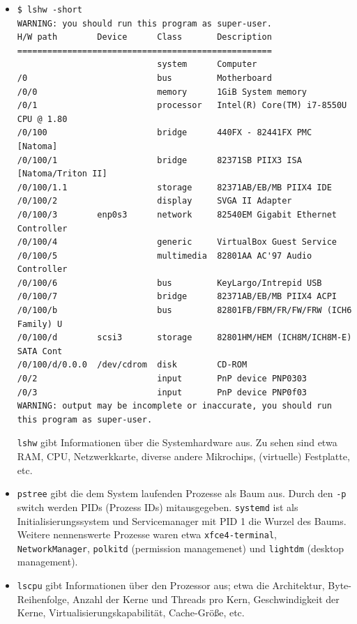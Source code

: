 \documentclass{article}
\begin{document}
\begin{itemize}
    \item \begin{lstlisting}[breaklines]
$ lshw -short
WARNING: you should run this program as super-user.
H/W path        Device      Class       Description
===================================================
                            system      Computer
/0                          bus         Motherboard
/0/0                        memory      1GiB System memory
/0/1                        processor   Intel(R) Core(TM) i7-8550U CPU @ 1.80
/0/100                      bridge      440FX - 82441FX PMC [Natoma]
/0/100/1                    bridge      82371SB PIIX3 ISA [Natoma/Triton II]
/0/100/1.1                  storage     82371AB/EB/MB PIIX4 IDE
/0/100/2                    display     SVGA II Adapter
/0/100/3        enp0s3      network     82540EM Gigabit Ethernet Controller
/0/100/4                    generic     VirtualBox Guest Service
/0/100/5                    multimedia  82801AA AC'97 Audio Controller
/0/100/6                    bus         KeyLargo/Intrepid USB
/0/100/7                    bridge      82371AB/EB/MB PIIX4 ACPI
/0/100/b                    bus         82801FB/FBM/FR/FW/FRW (ICH6 Family) U
/0/100/d        scsi3       storage     82801HM/HEM (ICH8M/ICH8M-E) SATA Cont
/0/100/d/0.0.0  /dev/cdrom  disk        CD-ROM
/0/2                        input       PnP device PNP0303
/0/3                        input       PnP device PNP0f03
WARNING: output may be incomplete or inaccurate, you should run this program as super-user.
        \end{lstlisting}

        \texttt{lshw} gibt Informationen über die Systemhardware aus. Zu sehen sind etwa RAM, CPU, Netzwerkkarte, diverse andere Mikrochips, (virtuelle) Festplatte, etc.

        \item \texttt{pstree} gibt die dem System laufenden Prozesse als Baum aus. Durch den \texttt{-p} switch werden PIDs (Prozess IDs) mitausgegeben. \texttt{systemd} ist als Initialisierungssystem und Servicemanager mit PID 1 die Wurzel des Baums. Weitere nennenswerte Prozesse waren etwa \texttt{xfce4-terminal}, \texttt{NetworkManager}, \texttt{polkitd} (permission managemenet) und \texttt{lightdm} (desktop management).
        
        \item \texttt{lscpu} gibt Informationen über den Prozessor aus; etwa die Architektur, Byte-Reihenfolge, Anzahl der Kerne und Threads pro Kern, Geschwindigkeit der Kerne, Virtualisierungskapabilität, Cache-Größe, etc.
        

\end{itemize}
\end{document}
